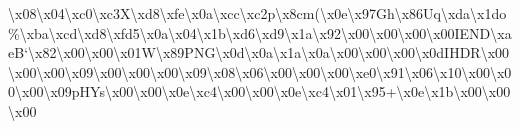 \textbackslash{}x08\textbackslash{}x04\textbackslash{}xc0\textbackslash{}xc3\+X\textbackslash{}xd8\textbackslash{}xfe\textbackslash{}x0a\textbackslash{}xcc\textbackslash{}xc2p\textbackslash{}x8cm(\textbackslash{}x0e\textbackslash{}x97\+Gh\textbackslash{}x86\+Uq\textbackslash{}xda\textbackslash{}x1do\%\textbackslash{}xba\textbackslash{}xcd\textbackslash{}xd8\textbackslash{}xfd5\textbackslash{}x0a\textbackslash{}x04\textbackslash{}x1b\textbackslash{}xd6\textbackslash{}xd9\textbackslash{}x1a\textbackslash{}x92\textbackslash{}x00\textbackslash{}x00\textbackslash{}x00\textbackslash{}x00\+I\+E\+N\+D\textbackslash{}xae\+B`\textbackslash{}x82\textbackslash{}x00\textbackslash{}x00\textbackslash{}x01\+W\textbackslash{}x89\+P\+N\+G\textbackslash{}x0d\textbackslash{}x0a\textbackslash{}x1a\textbackslash{}x0a\textbackslash{}x00\textbackslash{}x00\textbackslash{}x00\textbackslash{}x0d\+I\+H\+D\+R\textbackslash{}x00\textbackslash{}x00\textbackslash{}x00\textbackslash{}x09\textbackslash{}x00\textbackslash{}x00\textbackslash{}x00\textbackslash{}x09\textbackslash{}x08\textbackslash{}x06\textbackslash{}x00\textbackslash{}x00\textbackslash{}x00\textbackslash{}xe0\textbackslash{}x91\textbackslash{}x06\textbackslash{}x10\textbackslash{}x00\textbackslash{}x00\textbackslash{}x00\textbackslash{}x09p\+H\+Ys\textbackslash{}x00\textbackslash{}x00\textbackslash{}x0e\textbackslash{}xc4\textbackslash{}x00\textbackslash{}x00\textbackslash{}x0e\textbackslash{}xc4\textbackslash{}x01\textbackslash{}x95+\textbackslash{}x0e\textbackslash{}x1b\textbackslash{}x00\textbackslash{}x00\textbackslash{}x00 